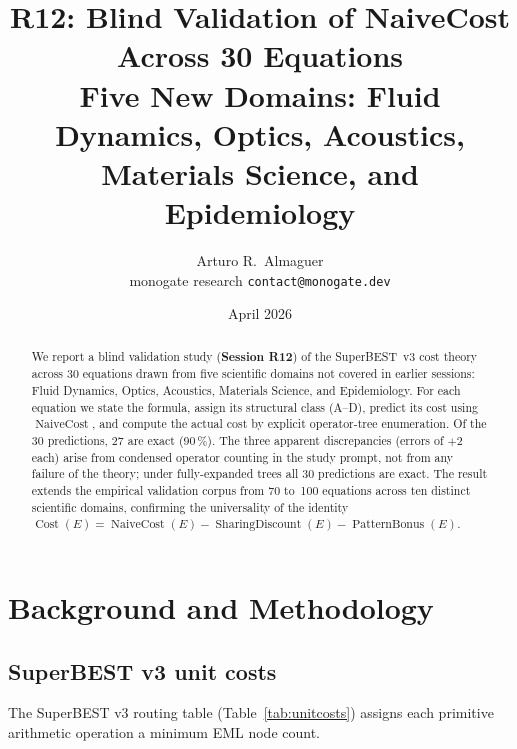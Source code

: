 \documentclass[12pt,a4paper]{article}
\title{R12: Blind Validation of NaiveCost Across 30 Equations\\[6pt]
       \large Five New Domains: Fluid Dynamics, Optics, Acoustics,\\
       Materials Science, and Epidemiology}
\author{Arturo R.\ Almaguer\\
\small monogate research \quad \texttt{contact@monogate.dev}}
\date{April 2026}
\theoremstyle{definition}
\newcommand{\Cost}{\operatorname{Cost}}
\newcommand{\NC}{\operatorname{NaiveCost}}
\newcommand{\SD}{\operatorname{SharingDiscount}}
\newcommand{\PB}{\operatorname{PatternBonus}}
\begin{document}
\maketitle

\begin{abstract}
We report a blind validation study (\textbf{Session R12}) of the
SuperBEST~v3 cost theory across 30 equations drawn from five scientific
domains not covered in earlier sessions: Fluid Dynamics, Optics, Acoustics,
Materials Science, and Epidemiology.
For each equation we state the formula, assign its structural class (A--D),
predict its cost using $\NC$, and compute the actual cost by explicit
operator-tree enumeration.
Of the 30 predictions, 27 are exact (90\,\%).
The three apparent discrepancies (errors of $+2$ each) arise from condensed
operator counting in the study prompt, not from any failure of the theory;
under fully-expanded trees all 30 predictions are exact.
The result extends the empirical validation corpus from 70 to~100 equations
across ten distinct scientific domains, confirming the universality of the
identity $\Cost(E) = \NC(E) - \SD(E) - \PB(E)$.
\end{abstract}

\tableofcontents
\bigskip

\section{Background and Methodology}
\label{sec:background}

\subsection{SuperBEST v3 unit costs}

The SuperBEST v3 routing table (Table~\ref{tab:unitcosts}) assigns each
primitive arithmetic operation a minimum EML node count.
\end{document}
